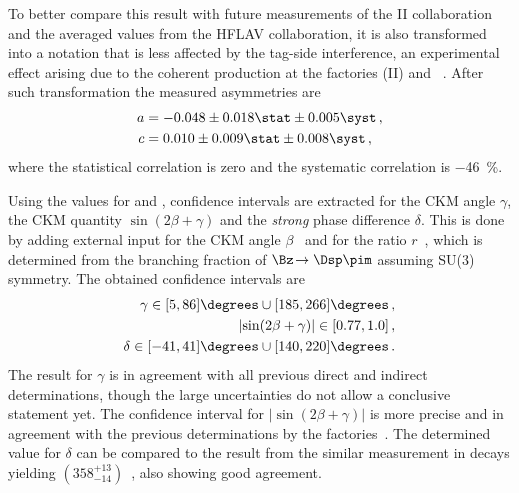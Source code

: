 To better compare this result with future measurements of the \belle II collaboration and the averaged values from the HFLAV collaboration, it is also transformed into a notation that is less affected by the tag-side interference, an experimental effect arising due to the coherent \Bz\Bzb production at the \B factories \belle (II) and \babar~\cite{Long:2003wq}.
After such transformation the measured \CP asymmetries are
\begin{equation}
\begin{aligned}
a&=-0.048\pm0.018\stat\pm0.005\syst\,,\nonumber\\
c&=0.010\pm0.009\stat\pm0.008\syst\,,\nonumber\\
\end{aligned}
\end{equation}
where the statistical correlation is zero and the systematic correlation is \SI{-46}{\percent}.

Using the values for \Sf and \Sfbar, confidence intervals are extracted for the CKM angle $\gamma$, the CKM quantity $\sin\!\left(2\beta+\gamma\right)$ and the \emph{strong} phase difference $\delta$.
This is done by adding external input for the CKM angle $\beta$~\cite{HFLAV2016} and for the ratio $r$~\cite{CKMfitter2015,Aoki:2016frl, Bazavov:2014wgs, Carrasco:2014poa}, which is determined from the branching fraction of $\Bz\!\to\Dsp\pim$ assuming SU(3) symmetry.
The obtained confidence intervals are
\begin{align*}
\gamma\in[5, 86]\degrees\cup[185, 266]\degrees\,,\nonumber\\
\left|\sin\!\left(2\beta+\gamma\right)\right|\in[0.77, 1.0]\,,\nonumber\\
\delta\in[-41, 41]\degrees\cup[140, 220]\degrees\,.\nonumber\\
\end{align*}
The result for $\gamma$ is in agreement with all previous direct and indirect determinations, though the large uncertainties do not allow a conclusive statement yet.
The confidence interval for $\left|\sin\!\left(2\beta+\gamma\right)\right|$ is more precise and in agreement with the previous determinations by the \B factories~\cite{Ronga:2006hv,Aubert:2006tw}.
The determined value for $\delta$ can be compared to the result from the similar measurement in \BsToDsK decays yielding $\left(358^{+13}_{-14}\right)$\degrees~\cite{Aaij:2017lff}, also showing good agreement.

